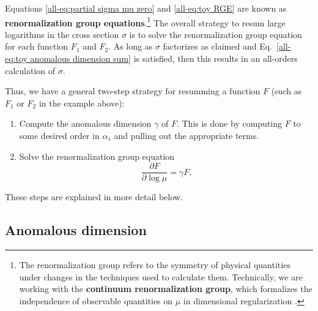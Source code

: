 \documentclass[../thesis.tex]{subfiles}
\begin{document}
	Equations \ref{all-eq:partial sigma mu zero} and \ref{all-eq:toy RGE} are known as \textbf{renormalization group equations}.\footnote{The renormalization group refers to the symmetry of physical quantities under changes in the techniques used to calculate them. Technically, we are working with the \textbf{continuum renormalization group}, which formalizes the independence of observable quantities on $\mu$ in dimensional regularization \cite{schwartz_quantum_2014}.} The overall strategy to resum large logarithms in the cross section $\sigma$ is to solve the renormalization group equation for each function $F_1$ and $F_2$. As long as $\sigma$ factorizes as claimed and Eq.~\ref{all-eq:toy anomalous dimension sum} is satisfied, then this results in an all-orders calculation of $\sigma$.

	Thus, we have a general two-step strategy for resumming a function $F$ (such as $F_1$ or $F_2$ in the example above):
	\begin{enumerate}
		\item Compute the anomalous dimension $\gamma$ of $F$. This is done by computing $F$ to some desired order in $\alpha_s$ and pulling out the appropriate terms. 

		\item Solve the renormalization group equation
		\begin{equation}\label{all-eq:general RGE}
			\frac{\partial F}{\partial \log \mu} = \gamma F.
		\end{equation}
	\end{enumerate}
	These steps are explained in more detail below.

\subsection{Anomalous dimension}
\end{document}
